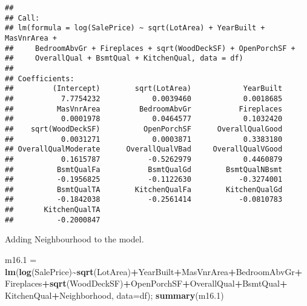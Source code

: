 \documentclass[
]{article}
\newenvironment{Shaded}{\begin{snugshade}}{\end{snugshade}}
\newcommand{\AttributeTok}[1]{\textcolor[rgb]{0.13,0.29,0.53}{#1}}
\newcommand{\FloatTok}[1]{\textcolor[rgb]{0.00,0.00,0.81}{#1}}
\newcommand{\FunctionTok}[1]{\textcolor[rgb]{0.13,0.29,0.53}{\textbf{#1}}}
\newcommand{\NormalTok}[1]{#1}
\newcommand{\OtherTok}[1]{\textcolor[rgb]{0.56,0.35,0.01}{#1}}
\newcommand{\SpecialCharTok}[1]{\textcolor[rgb]{0.81,0.36,0.00}{\textbf{#1}}}
\begin{document}
\begin{verbatim}
## 
## Call:
## lm(formula = log(SalePrice) ~ sqrt(LotArea) + YearBuilt + MasVnrArea + 
##     BedroomAbvGr + Fireplaces + sqrt(WoodDeckSF) + OpenPorchSF + 
##     OverallQual + BsmtQual + KitchenQual, data = df)
## 
## Coefficients:
##         (Intercept)        sqrt(LotArea)            YearBuilt  
##           7.7754232            0.0039460            0.0018685  
##          MasVnrArea         BedroomAbvGr           Fireplaces  
##           0.0001978            0.0464577            0.1032420  
##    sqrt(WoodDeckSF)          OpenPorchSF      OverallQualGood  
##           0.0031271            0.0003871            0.3383180  
## OverallQualModerate      OverallQualVBad     OverallQualVGood  
##           0.1615787           -0.5262979            0.4460879  
##          BsmtQualFa           BsmtQualGd        BsmtQualNBsmt  
##          -0.1956825           -0.1122630           -0.3274001  
##          BsmtQualTA        KitchenQualFa        KitchenQualGd  
##          -0.1842038           -0.2561414           -0.0810783  
##       KitchenQualTA  
##          -0.2000847
\end{verbatim}

Adding Neighbourhood to the model.

\begin{Shaded}
\begin{Highlighting}[]
\NormalTok{m16}\FloatTok{.1} \OtherTok{=} \FunctionTok{lm}\NormalTok{(}\FunctionTok{log}\NormalTok{(SalePrice)}\SpecialCharTok{\textasciitilde{}}\FunctionTok{sqrt}\NormalTok{(LotArea)}\SpecialCharTok{+}\NormalTok{YearBuilt}\SpecialCharTok{+}\NormalTok{MasVnrArea}\SpecialCharTok{+}\NormalTok{BedroomAbvGr}\SpecialCharTok{+}
\NormalTok{             Fireplaces}\SpecialCharTok{+}\FunctionTok{sqrt}\NormalTok{(WoodDeckSF)}\SpecialCharTok{+}\NormalTok{OpenPorchSF}\SpecialCharTok{+}\NormalTok{OverallQual}\SpecialCharTok{+}\NormalTok{BsmtQual}\SpecialCharTok{+}
\NormalTok{             KitchenQual}\SpecialCharTok{+}\NormalTok{Neighborhood, }\AttributeTok{data=}\NormalTok{df); }\FunctionTok{summary}\NormalTok{(m16}\FloatTok{.1}\NormalTok{)}
\end{Highlighting}
\end{Shaded}
\end{document}
